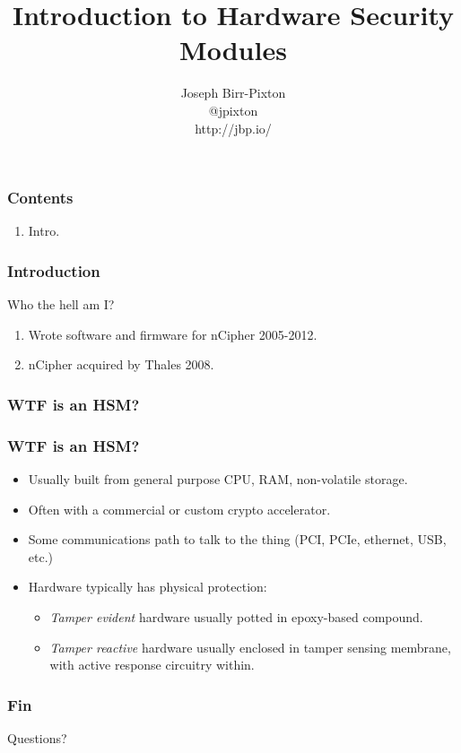 \documentclass{beamer}
\title[hsms]{Introduction to Hardware Security Modules}
\author{Joseph Birr-Pixton\\
@jpixton\\
http://jbp.io/}
\date{}
\begin{document}
\frame{\titlepage}

\frame
{
  \frametitle{Contents}

  \begin{enumerate}
    \item<1> Intro.
  \end{enumerate}
}

\frame
{
  \frametitle{Introduction}
  Who the hell am I?

  \begin{enumerate}
    \item<2->{Wrote software and firmware for nCipher 2005-2012.}
    \item<3->{nCipher acquired by Thales 2008.}
  \end{enumerate}
}

\frame
{
  \frametitle{WTF is an HSM?}

}

\frame
{
  \frametitle{WTF is an HSM?}

  \begin{itemize}
  \item<1-> Usually built from general purpose CPU, RAM, non-volatile storage.
  \item<2-> Often with a commercial or custom crypto accelerator.
  \item<3-> Some communications path to talk to the thing (PCI, PCIe, ethernet, USB, etc.)
  \item<4-> Hardware typically has physical protection:
    \begin{itemize}
    \item<5-> \emph{Tamper evident} hardware usually potted in epoxy-based compound.
    \item<6-> \emph{Tamper reactive} hardware usually enclosed in tamper sensing membrane, with active response circuitry within.
    \end{itemize}
  \end{itemize}
}

\frame
{
  \frametitle{Fin}
  Questions?
}
\end{document}
